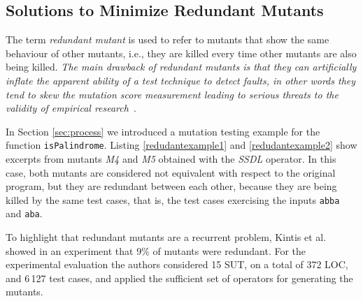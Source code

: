 
\subsection{Solutions to Minimize Redundant Mutants}
\label{sec:opt:redundant}

The term \emph{redundant mutant} is used to refer to mutants that show the same behaviour of other mutants, i.e., they
are killed every time other mutants are also being killed. 
\emph{The main drawback of redundant mutants is that they can artificially inflate the apparent ability of a test technique to detect faults, in other words they tend to skew the mutation score measurement leading to serious threats to the validity of empirical research}~\cite{papadakis2016threats}.




In Section \ref{sec:process} we introduced a mutation testing example for the function \texttt{isPalindrome}. 
Listing \ref{redudantexample1} and \ref{redudantexample2} show excerpts from mutants \textit{M4} and \textit{M5} obtained with the \textit{SSDL} operator. In this case, both mutants are considered not equivalent with respect to the original program, but they are redundant between each other, because they are being killed by the same test cases, that is, the test cases exercising the inputs \texttt{abba} and \texttt{aba}.


To highlight that redundant mutants are a recurrent problem, Kintis et al. \cite{kintis2010evaluating} showed in an experiment that 9\% of mutants were redundant. For the experimental evaluation the authors considered 15 SUT, on a total of 372 LOC, and 6\,127 test cases, and applied the sufficient set of operators for generating the mutants. 



